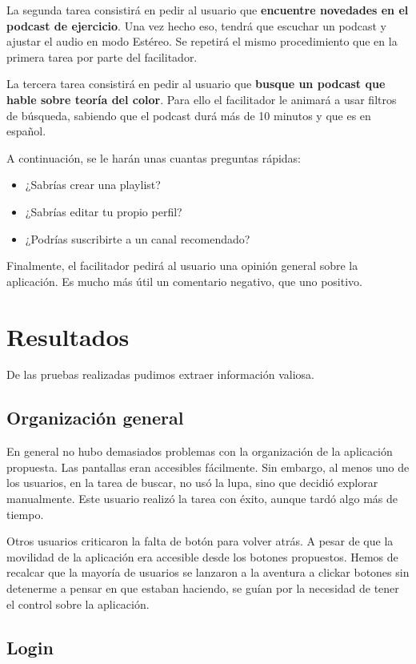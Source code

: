 \documentclass[a4paper]{article}
\begin{document}
La segunda tarea consistirá en pedir al usuario que \textbf{encuentre novedades en el podcast de ejercicio}. Una vez hecho eso, tendrá que escuchar un podcast y ajustar el audio en modo Estéreo. Se repetirá el mismo procedimiento que en la primera tarea por parte del facilitador.

La tercera tarea consistirá en pedir al usuario que \textbf{busque un podcast que hable sobre teoría del color}. Para ello el facilitador le animará a usar filtros de búsqueda, sabiendo que el podcast durá más de 10 minutos y que es en español.

A continuación, se le harán unas cuantas preguntas rápidas:
\begin{itemize}
\item ¿Sabrías crear una playlist?
\item ¿Sabrías editar tu propio perfil?
\item ¿Podrías suscribirte a un canal recomendado?
\end{itemize}

Finalmente, el facilitador pedirá al usuario una opinión general sobre la aplicación. Es mucho más útil un comentario negativo, que uno positivo.

\section{Resultados}

De las pruebas realizadas pudimos extraer información valiosa.

\subsection{Organización general}

En general no hubo demasiados problemas con la organización de la aplicación propuesta. Las pantallas eran accesibles fácilmente. Sin embargo, al menos uno de los usuarios, en la tarea de buscar, no usó la lupa, sino que decidió explorar manualmente. Este usuario realizó la tarea con éxito, aunque tardó algo más de tiempo.

Otros usuarios criticaron la falta de botón para volver atrás. A pesar de que la movilidad de la aplicación era accesible desde los botones propuestos. Hemos de recalcar que la mayoría de usuarios se lanzaron a la aventura a clickar botones sin detenerme a pensar en que estaban haciendo, se guían por la necesidad de tener el control sobre la aplicación.

\subsection{Login}
\end{document}
